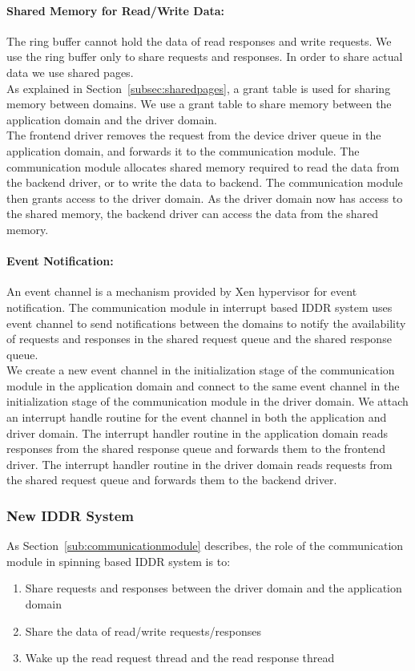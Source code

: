 \paragraph{Shared Memory for Read/Write Data:}
The ring buffer cannot hold the data of read responses and write requests. We use the ring buffer only to share requests and responses. In order to share actual data we use shared pages. 
\\[3mm]
As explained in Section~\ref{subsec:sharedpages}, a grant table is used for sharing memory between domains. We use a grant table to share memory between the application domain and the driver domain.
\\[3mm]
The frontend driver removes the request from the device driver queue in the application domain, and forwards it to the communication module. The communication module allocates shared memory required to read the data from the backend driver, or to write the data to backend. The communication module then grants access to the driver domain. As the driver domain now has access to the shared memory, the backend driver can access the data from the shared memory.

\paragraph{Event Notification:}
An event channel is a mechanism provided by Xen hypervisor for event notification. The communication module in interrupt based IDDR system uses event channel to send notifications between the domains to notify the availability of requests and responses in the shared request queue and the shared response queue. 
\\[3mm]
We create a new event channel in the initialization stage of the communication module in the application domain and connect to the same event channel in the initialization stage of the communication module in the driver domain. We attach an interrupt handle routine for the event channel in both the application and driver domain. The interrupt handler routine in the application domain reads responses from the shared response queue and forwards them to the frontend driver. The interrupt handler routine in the driver domain reads requests from the shared request queue and forwards them to the backend driver.

\subsubsection*{New IDDR System}
As Section~\ref{sub:communicationmodule} describes, the role of the communication module in spinning based IDDR system is to:
\begin{enumerate} 
\item Share requests and responses between the driver domain and the application domain
\item Share the data of read/write requests/responses
\item Wake up the read request thread and the read response thread
\end{enumerate}
